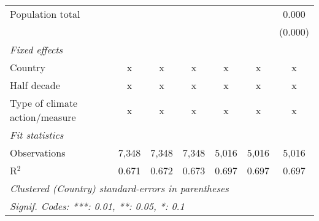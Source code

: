 \begin{tabular}{lcccccc}
   Population total                                                        &         &                &                &                &                & 0.000\\   
                                                                           &         &                &                &                &                & (0.000)\\   
   \emph{Fixed effects}\\
   Country                                                                 & x       & x              & x              & x              & x              & x\\  
   Half decade                                                             & x       & x              & x              & x              & x              & x\\  
   Type of climate action/measure                                          & x       & x              & x              & x              & x              & x\\  
   \midrule \emph{Fit statistics}\\
   Observations                                                            & 7,348   & 7,348          & 7,348          & 5,016          & 5,016          & 5,016\\  
   R$^2$                                                                   & 0.671   & 0.672          & 0.673          & 0.697          & 0.697          & 0.697\\  
   \midrule
   \multicolumn{7}{l}{\emph{Clustered (Country) standard-errors in parentheses}}\\
   \multicolumn{7}{l}{\emph{Signif. Codes: ***: 0.01, **: 0.05, *: 0.1}}\\
\end{tabular}
\par\endgroup


